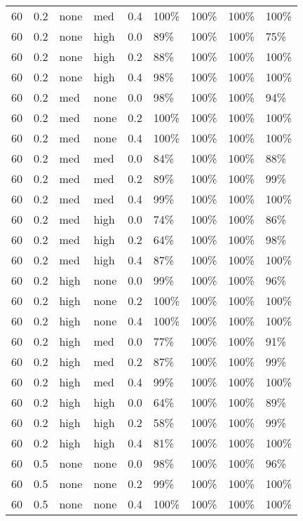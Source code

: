 \begin{longtable}{rrllrllll}
  60 & 0.2 & none & med & 0.4 & 100\% & 100\% & 100\% & 100\% \\ 
  60 & 0.2 & none & high & 0.0 & 89\% & 100\% & 100\% & 75\% \\ 
  60 & 0.2 & none & high & 0.2 & 88\% & 100\% & 100\% & 100\% \\ 
  60 & 0.2 & none & high & 0.4 & 98\% & 100\% & 100\% & 100\% \\ 
  60 & 0.2 & med & none & 0.0 & 98\% & 100\% & 100\% & 94\% \\ 
  60 & 0.2 & med & none & 0.2 & 100\% & 100\% & 100\% & 100\% \\ 
  60 & 0.2 & med & none & 0.4 & 100\% & 100\% & 100\% & 100\% \\ 
  60 & 0.2 & med & med & 0.0 & 84\% & 100\% & 100\% & 88\% \\ 
  60 & 0.2 & med & med & 0.2 & 89\% & 100\% & 100\% & 99\% \\ 
  60 & 0.2 & med & med & 0.4 & 99\% & 100\% & 100\% & 100\% \\ 
  60 & 0.2 & med & high & 0.0 & 74\% & 100\% & 100\% & 86\% \\ 
  60 & 0.2 & med & high & 0.2 & 64\% & 100\% & 100\% & 98\% \\ 
  60 & 0.2 & med & high & 0.4 & 87\% & 100\% & 100\% & 100\% \\ 
  60 & 0.2 & high & none & 0.0 & 99\% & 100\% & 100\% & 96\% \\ 
  60 & 0.2 & high & none & 0.2 & 100\% & 100\% & 100\% & 100\% \\ 
  60 & 0.2 & high & none & 0.4 & 100\% & 100\% & 100\% & 100\% \\ 
  60 & 0.2 & high & med & 0.0 & 77\% & 100\% & 100\% & 91\% \\ 
  60 & 0.2 & high & med & 0.2 & 87\% & 100\% & 100\% & 99\% \\ 
  60 & 0.2 & high & med & 0.4 & 99\% & 100\% & 100\% & 100\% \\ 
  60 & 0.2 & high & high & 0.0 & 64\% & 100\% & 100\% & 89\% \\ 
  60 & 0.2 & high & high & 0.2 & 58\% & 100\% & 100\% & 99\% \\ 
  60 & 0.2 & high & high & 0.4 & 81\% & 100\% & 100\% & 100\% \\ 
  60 & 0.5 & none & none & 0.0 & 98\% & 100\% & 100\% & 96\% \\ 
  60 & 0.5 & none & none & 0.2 & 99\% & 100\% & 100\% & 100\% \\ 
  60 & 0.5 & none & none & 0.4 & 100\% & 100\% & 100\% & 100\% \\ 

\end{longtable}
